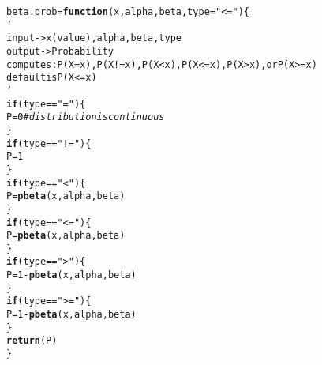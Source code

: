 \documentclass{article}\usepackage[]{graphicx}\usepackage[]{xcolor}
\makeatletter
\newcommand{\hlnum}[1]{\textcolor[rgb]{0.686,0.059,0.569}{#1}}%
\newcommand{\hlsng}[1]{\textcolor[rgb]{0.192,0.494,0.8}{#1}}%
\newcommand{\hlcom}[1]{\textcolor[rgb]{0.678,0.584,0.686}{\textit{#1}}}%
\newcommand{\hlopt}[1]{\textcolor[rgb]{0,0,0}{#1}}%
\newcommand{\hldef}[1]{\textcolor[rgb]{0.345,0.345,0.345}{#1}}%
\newcommand{\hlkwa}[1]{\textcolor[rgb]{0.161,0.373,0.58}{\textbf{#1}}}%
\newcommand{\hlkwb}[1]{\textcolor[rgb]{0.69,0.353,0.396}{#1}}%
\newcommand{\hlkwc}[1]{\textcolor[rgb]{0.333,0.667,0.333}{#1}}%
\newcommand{\hlkwd}[1]{\textcolor[rgb]{0.737,0.353,0.396}{\textbf{#1}}}%
\newenvironment{kframe}{%
 \def\at@end@of@kframe{}%
 \ifinner\ifhmode%
  \def\at@end@of@kframe{\end{minipage}}%
  \begin{minipage}{\columnwidth}%
 \fi\fi%
 \def\FrameCommand##1{\hskip\@totalleftmargin \hskip-\fboxsep
 \colorbox{shadecolor}{##1}\hskip-\fboxsep
     \hskip-\linewidth \hskip-\@totalleftmargin \hskip\columnwidth}%
 \MakeFramed {\advance\hsize-\width
   \@totalleftmargin\z@ \linewidth\hsize
   \@setminipage}}%
 {\par\unskip\endMakeFramed%
 \at@end@of@kframe}
\newenvironment{knitrout}{}{} %
\makeatother
\begin{document}
\begin{enumerate}
\begin{knitrout}\scriptsize
{}\color{fgcolor}\begin{kframe}
\begin{alltt}
\hldef{beta.prob} \hlkwb{=} \hlkwa{function}\hldef{(}\hlkwc{x}\hldef{,} \hlkwc{alpha}\hldef{,} \hlkwc{beta}\hldef{,} \hlkwc{type} \hldef{=} \hlsng{"<="}\hldef{)\{}
  \hlsng{'
  input -> x(value), alpha, beta, type
  output -> Probability
  computes: P(X=x), P(X!=x), P(X<x), P(X<=x), P(X>x), or P(X>=x)
  default is P(X<=x)
  '}
  \hlkwa{if} \hldef{(type} \hlopt{==} \hlsng{"="}\hldef{)\{}
    \hldef{P} \hlkwb{=} \hlnum{0} \hlcom{#distribution is continuous}
  \hldef{\}}
  \hlkwa{if} \hldef{(type} \hlopt{==} \hlsng{"!="}\hldef{)\{}
    \hldef{P} \hlkwb{=} \hlnum{1}
  \hldef{\}}
  \hlkwa{if} \hldef{(type} \hlopt{==} \hlsng{"<"}\hldef{)\{}
    \hldef{P} \hlkwb{=} \hlkwd{pbeta}\hldef{(x, alpha, beta)}
  \hldef{\}}
  \hlkwa{if} \hldef{(type} \hlopt{==}  \hlsng{"<="}\hldef{)\{}
    \hldef{P} \hlkwb{=} \hlkwd{pbeta}\hldef{(x, alpha, beta)}
  \hldef{\}}
  \hlkwa{if} \hldef{(type} \hlopt{==} \hlsng{">"}\hldef{)\{}
    \hldef{P} \hlkwb{=} \hlnum{1} \hlopt{-} \hlkwd{pbeta}\hldef{(x, alpha, beta)}
  \hldef{\}}
  \hlkwa{if} \hldef{(type} \hlopt{==} \hlsng{">="}\hldef{)\{}
    \hldef{P} \hlkwb{=} \hlnum{1} \hlopt{-} \hlkwd{pbeta}\hldef{(x, alpha, beta)}
  \hldef{\}}
  \hlkwd{return}\hldef{(P)}
\hldef{\}}
\end{alltt}
\end{kframe}
\end{knitrout}
\end{enumerate}

\end{document}
